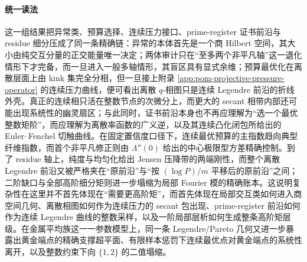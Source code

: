\paragraph{统一读法}
这一组结果把异常类、预算选择、连续压力接口、prime-register 证书前沿与 residue 细分压成了同一条精确链：异常的本体首先是一个商 Hilbert 空间，其大小由纯交互分量的正交能量唯一决定；两体审计只在“至多两个非平凡轴”这一退化情形下才完备，而一旦进入一般多轴情形，其盲区具有显式余维；预算最优化在离散层面上由 kink 集完全分相，但一旦接上附录 \ref{app:pom-projective-pressure-operator} 的连续压力曲线，便可看出离散 \(q\)-相图只是连续 Legendre 前沿的折线外壳。真正的连续相只活在整数节点的次微分上，而更大的 secant 相带内部还可能出现系统性的幽灵扇区；与此同时，证书前沿本身也不再应理解为“选一个最优整数矩阶”，而应理解为离散率函数的广义逆，以及其连续凸化闭包所给出的 Euler--Fenchel 切触曲线。在固定置信度口径下，连续最优预算的主指数趋向典型纤维指数，而首个非平凡修正则由 \(\Lambda''(0)\) 给出的中心极限型方差精确控制。到了 residue 轴上，纯度与均匀化给出 Jensen 压降带的两端刚性，而整个离散 Legendre 前沿又被严格夹在“原前沿”与“按 \((\log P)/m\) 平移后的原前沿”之间；二阶缺口与全部高阶细分矩则进一步塌缩为局部 Fourier 模的精确账本。这说明复杂性在这里并不首先体现在“需要更高阶矩”，而首先体现在局部交互类如何进入商空间几何、离散相图如何作为连续压力的 secant 包出现、prime-register 前沿如何作为连续 Legendre 曲线的整数采样，以及一阶局部层析如何生成整条高阶矩层级。在金属平均族这一一参数模型上，同一条 Legendre/Pareto 几何又进一步暴露出黄金端点的精确支撑超平面、有限样本惩罚下连续最优点对黄金端点的系统性离开，以及整数约束下向 \(\{1,2\}\) 的二值塌缩。

\endinput
